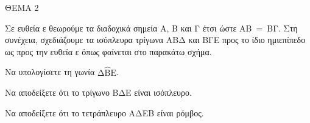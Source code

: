 
ΘΕΜΑ 2

Σε ευθεία ε θεωρούμε τα διαδοχικά σημεία Α, Β και Γ έτσι ώστε ΑΒ$\  = \ $ΒΓ. Στη συνέχεια, σχεδιάζουμε τα ισόπλευρα τρίγωνα ΑΒΔ και ΒΓΕ προς το ίδιο ημιεπίπεδο ως προς την ευθεία ε όπως φαίνεται στο παρακάτω σχήμα.

\begin{alist}
\item Να υπολογίσετε τη γωνία $\text{Δ}\widehat{\text{Β}}\text{Ε}$.


\item Να αποδείξετε ότι το τρίγωνο ΒΔΕ είναι ισόπλευρο.


\item Να αποδείξετε ότι το τετράπλευρο ΑΔΕΒ είναι ρόμβος.



\end{alist}
